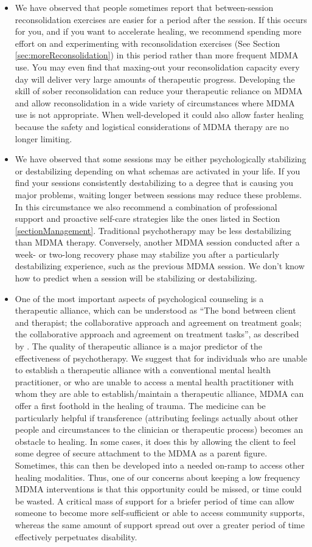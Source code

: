 \documentclass[12pt,letterpaper]{book}
\begin{document}
\begin{itemize}
    \item We have observed that people sometimes report that between-session reconsolidation exercises are easier for a period after the session. If this occurs for you, and if you want to accelerate healing, we recommend spending more effort on and experimenting with reconsolidation exercises (See Section \ref{sec:moreReconsolidation}) in this period rather than more frequent MDMA use. You may even find that maxing-out your reconsolidation capacity every day will deliver very large amounts of therapeutic progress. Developing the skill of sober reconsolidation can reduce your therapeutic reliance on MDMA and allow reconsolidation in a wide variety of circumstances where MDMA use is not appropriate. When well-developed it could also allow faster healing because the safety and logistical considerations of MDMA therapy are no longer limiting.
    \item We have observed that some sessions may be either psychologically stabilizing or destabilizing depending on what schemas are activated in your life. If you find your sessions consistently destabilizing to a degree that is causing you major problems, waiting longer between sessions may reduce these problems. In this circumstance we also recommend a combination of professional support and proactive self-care strategies like the ones listed in Section \ref{sectionManagement}. Traditional psychotherapy may be less destabilizing than MDMA therapy. Conversely, another MDMA session conducted after a week- or two-long recovery phase may stabilize you after a particularly destabilizing experience, such as the previous MDMA session. We don't know how to predict when a session will be stabilizing or destabilizing.
    \item One of the most important aspects of psychological counseling is a therapeutic alliance, which can be understood as “The bond between client and therapist; the collaborative approach and agreement on treatment goals; the collaborative approach and agreement on treatment tasks”, as described by \textcite{BRWAIdownload}. The quality of therapeutic alliance is a major predictor of the effectiveness of psychotherapy. We suggest that for individuals who are unable to establish a therapeutic alliance with a conventional mental health practitioner, or who are unable to access a mental health practitioner with whom they are able to establish/maintain a therapeutic alliance, MDMA can offer a first foothold in the healing of trauma. The medicine can be particularly helpful if transference (attributing feelings actually about other people and circumstances to the clinician or therapeutic process) becomes an obstacle to healing. In some cases, it does this by allowing the client to feel some degree of secure attachment to the MDMA as a parent figure. Sometimes, this can then be developed into a needed on-ramp to access other healing modalities. Thus, one of our concerns about keeping a low frequency MDMA interventions is that this opportunity could be missed, or time could be wasted. A critical mass of support for a briefer period of time can allow someone to become more self-sufficient or able to access community supports, whereas the same amount of support spread out over a greater period of time effectively perpetuates disability.

\end{itemize}
\end{document}
